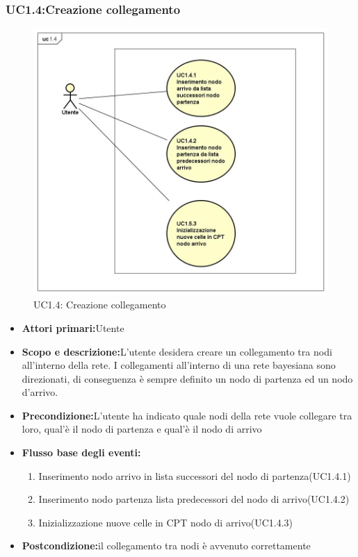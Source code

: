 \subsubsection{UC1.4:Creazione collegamento}
\begin{figure} [H]
	\centering
	\includegraphics[scale=0.45]{Img/UC1-4}
	\caption{UC1.4: Creazione collegamento}\label{}
\end{figure}
\begin{itemize}
	\item{\textbf{Attori primari:}Utente}
	\item{\textbf{Scopo e descrizione:}L'utente desidera creare un collegamento tra nodi all'interno della rete. I collegamenti all'interno di una rete bayesiana sono direzionati, di conseguenza è sempre definito un nodo di partenza ed un nodo d'arrivo.}
	\item{\textbf{Precondizione:}L'utente ha indicato quale nodi della rete vuole collegare tra loro, qual'è il nodo di partenza e qual'è il nodo di arrivo}
	\item{\textbf{Flusso base degli eventi:}}
		\begin{enumerate}
			\item{Inserimento nodo arrivo in lista successori del nodo di partenza(UC1.4.1)}
			\item{Inserimento nodo partenza lista predecessori del nodo di arrivo(UC1.4.2)}
			\item{Inizializzazione nuove celle in CPT nodo di arrivo(UC1.4.3)}
		\end{enumerate}
	\item{\textbf{Postcondizione:}il collegamento tra nodi è avvenuto correttamente}
\end{itemize}
